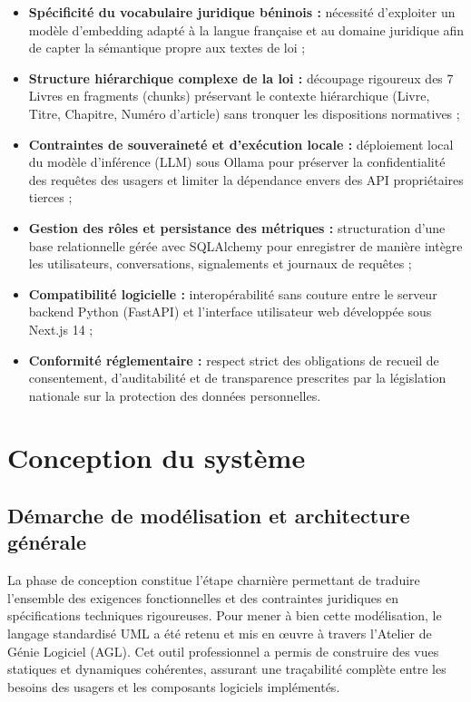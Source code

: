 \begin{itemize}
    \item \textbf{Spécificité du vocabulaire juridique béninois :} nécessité d'exploiter un modèle d'embedding adapté à la langue française et au domaine juridique afin de capter la sémantique propre aux textes de loi ;
    
    \item \textbf{Structure hiérarchique complexe de la loi :} découpage rigoureux des 7 Livres en fragments (chunks) préservant le contexte hiérarchique (Livre, Titre, Chapitre, Numéro d'article) sans tronquer les dispositions normatives ;
    
    \item \textbf{Contraintes de souveraineté et d'exécution locale :} déploiement local du modèle d'inférence (LLM) sous Ollama pour préserver la confidentialité des requêtes des usagers et limiter la dépendance envers des API propriétaires tierces ;
    
    \item \textbf{Gestion des rôles et persistance des métriques :} structuration d'une base relationnelle gérée avec SQLAlchemy pour enregistrer de manière intègre les utilisateurs, conversations, signalements et journaux de requêtes ;
    
    \item \textbf{Compatibilité logicielle :} interopérabilité sans couture entre le serveur backend Python (FastAPI) et l'interface utilisateur web développée sous Next.js 14 ;
    
    \item \textbf{Conformité réglementaire :} respect strict des obligations de recueil de consentement, d'auditabilité et de transparence prescrites par la législation nationale sur la protection des données personnelles.
\end{itemize}

\section{Conception du système}

\subsection{Démarche de modélisation et architecture générale}

La phase de conception constitue l'étape charnière permettant de traduire l'ensemble des exigences fonctionnelles et des contraintes juridiques en spécifications techniques rigoureuses. Pour mener à bien cette modélisation, le langage standardisé UML a été retenu et mis en œuvre à travers l'Atelier de Génie Logiciel (AGL). Cet outil professionnel a permis de construire des vues statiques et dynamiques cohérentes, assurant une traçabilité complète entre les besoins des usagers et les composants logiciels implémentés.

